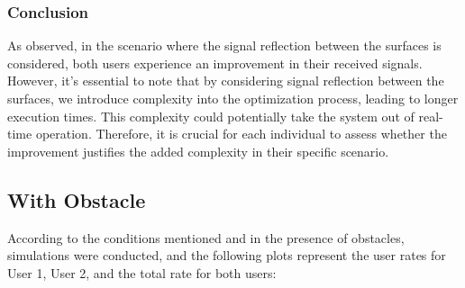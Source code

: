 \documentclass{article}
\begin{document}
\subsubsection{Conclusion}
 As observed, in the scenario where the signal reflection between the surfaces is considered, both users experience an improvement in their received signals. However, it's essential to note that by considering signal reflection between the surfaces, we introduce complexity into the optimization process, leading to longer execution times. This complexity could potentially take the system out of real-time operation. Therefore, it is crucial for each individual to assess whether the improvement justifies the added complexity in their specific scenario.

\subsection{With Obstacle}
According to the conditions mentioned and in the presence of obstacles, simulations were conducted, and the following plots represent the user rates for User 1, User 2, and the total rate for both users:
\end{document}
